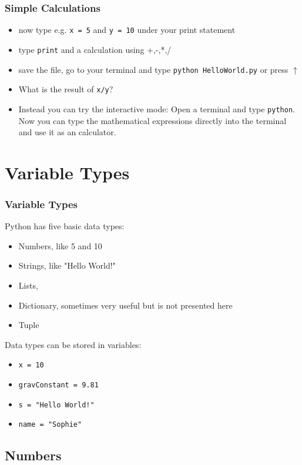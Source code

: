 \documentclass{beamer}
\begin{document}
\begin{frame}
\frametitle{Simple Calculations}
			\begin{itemize}
				\item now type e.g. \texttt{x = 5} and \texttt{y = 10} under your print statement
				\item type \texttt{print} and a calculation using +,-,*,/
				\item save the file, go to your terminal and type \texttt{python HelloWorld.py} or press $\uparrow$
				\item What is the result of \texttt{x/y}?
				\item Instead you can try the interactive mode: Open a terminal and type \texttt{python}. Now you can type the mathematical expressions directly into the terminal and use it as an calculator.
			\end{itemize}
\end{frame}

\section{Variable Types}

\begin{frame}
\frametitle{Variable Types}
	Python has five basic data types:
	\begin{itemize}
		\item Numbers, like 5 and 10
		\item Strings, like "Hello World!"
		\item Lists, 
		\item Dictionary, sometimes very useful but is not presented here
		\item Tuple
	\end{itemize}
	Data types can be stored in variables:
	\begin{itemize}
		\item  \texttt{x = 10}
		\item  \texttt{gravConstant = 9.81}
		\item  \texttt{s = "Hello World!"}
		\item  \texttt{name = "Sophie"}
	\end{itemize}
\end{frame}

\subsection{Numbers}
\end{document}
